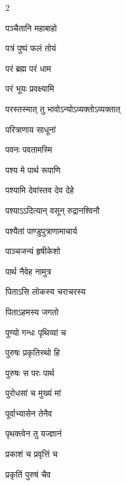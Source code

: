 \begin{multicols}{2}
\begin{indexlist}
\item पञ्चैतानि महाबाहो \dotfill {}
\item पत्रं पुष्पं फलं तोयं \dotfill {}
\item परं ब्रह्म परं धाम \dotfill {}
\item परं भूयः प्रवक्ष्यामि \dotfill {}
\item परस्तस्मात् तु भावोऽन्योऽव्यक्तोऽव्यक्तात् \dotfill {}
\item परित्राणाय साधूनां \dotfill {}
\item पवनः पवतामस्मि \dotfill {}
\item पश्य मे पार्थ रूपाणि \dotfill {}
\item पश्यामि देवांस्तव देव देहे \dotfill {}
\item पश्याऽऽदित्यान् वसून् रुद्रानश्विनौ \dotfill {}
\item पश्यैतां पाण्डुपुत्राणामाचार्य \dotfill {}
\item पाञ्चजन्यं हृषीकेशो \dotfill {}
\item पार्थ नैवेह नामुत्र \dotfill {}
\item पिताऽसि लोकस्य चराचरस्य \dotfill {}
\item पिताऽहमस्य जगतो \dotfill {}
\item पुण्यो गन्धः पृथिव्यां च \dotfill {}
\item पुरुषः प्रकृतिस्थो हि \dotfill {}
\item पुरुषः स परः पार्थ \dotfill {}
\item पुरोधसां च मुख्यं मां \dotfill {}
\item पूर्वाभ्यासेन तेनैव \dotfill {}
\item पृथक्त्वेन तु यज्ज्ञानं \dotfill {}
\item प्रकाशं च प्रवृत्तिं च \dotfill {}
\item प्रकृतिं पुरुषं चैव \dotfill {}

\end{indexlist}
\end{multicols}
